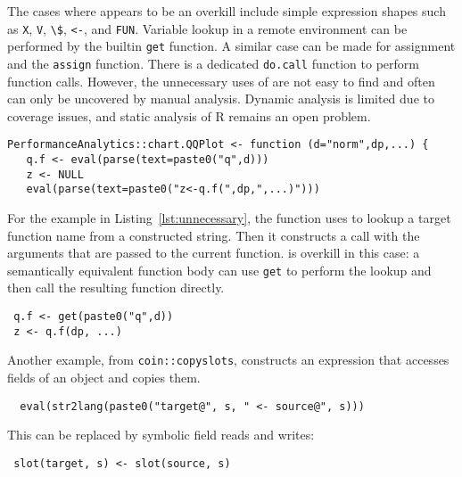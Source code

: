\documentclass[review,screen,acmsmall]{acmart}%
\renewcommand{\k}[1]{\lstinline |#1|\xspace}
\begin{document}
The cases where \eval appears to be an overkill include simple expression shapes
such as \k{X}, \k{V}, \k{\$}, \k{<-}, and \k{FUN}. Variable lookup in a remote
environment can be performed by the builtin \k{get} function. A similar case can
be made for assignment and the \k{assign} function. There is a dedicated
\k{do.call} function to perform function calls. However, the unnecessary uses of
\eval are not easy to find and often can only be uncovered by manual analysis.
Dynamic analysis is limited due to coverage issues, and static analysis of R
remains an open problem.


\begin{lstlisting}[caption={Unnecessary use of \eval},label=lst:unnecessary]
 PerformanceAnalytics::chart.QQPlot <- function (d="norm",dp,...) {
   q.f <- eval(parse(text=paste0("q",d)))
   z <- NULL
   eval(parse(text=paste0("z<-q.f(",dp,",...)")))
\end{lstlisting}

For the example in Listing~\ref{lst:unnecessary}, the function uses \eval to
lookup a target function name from a constructed string. Then it constructs a
call with the arguments that are passed to the current function. \Eval is
overkill in this case: a semantically equivalent function body can use \k{get}
to perform the lookup and then call the resulting function directly.

\begin{lstlisting}
 q.f <- get(paste0("q",d))
 z <- q.f(dp, ...)
\end{lstlisting}

Another example, from \k{coin::copyslots}, constructs an expression that accesses
fields of an object and copies them. 

\begin{lstlisting}
  eval(str2lang(paste0("target@", s, " <- source@", s)))
\end{lstlisting}


This can be replaced by symbolic field reads and writes:

\begin{lstlisting}
 slot(target, s) <- slot(source, s)
\end{lstlisting}

\end{document}
